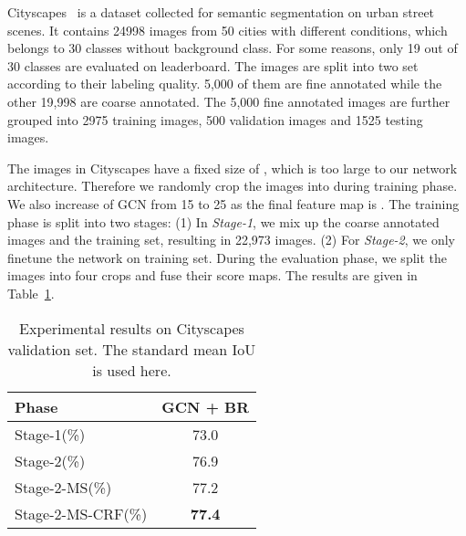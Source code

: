 \documentclass[10pt,twocolumn,letterpaper]{article}
\begin{document}
   Cityscapes~\cite{cordts2016cityscapes} is a dataset collected for semantic segmentation on urban street scenes. It contains 24998 images from 50 cities with different conditions, which belongs to 30 classes without background class. For some reasons, only 19 out of 30 classes are evaluated on leaderboard. The images are split into two set according to their labeling quality. 5,000 of them are fine annotated while the other 19,998 are coarse annotated. The 5,000 fine annotated images are further grouped into 2975 training images, 500 validation images and 1525 testing images. 
\par
   The images in Cityscapes have a fixed size of , which is too large to our network architecture. Therefore we randomly crop the images into  during training phase. We also increase  of GCN from 15 to 25 as the final feature map is . The training phase is split into two stages: (1) In \emph{Stage-1}, we mix up the coarse annotated images and the training set, resulting in 22,973 images. (2) For \emph{Stage-2}, we only finetune the network on training set. During the evaluation phase, we split the images into four  crops and fuse their score maps. The results are given in Table~\ref{table:cityscapes-train-val}. 
         \begin{table}[h]
      \begin{center}
\begin{tabular}{|l|c|}
            \hline
            Phase & GCN + BR\\
            \hline
            Stage-1(\%) & 73.0\\
            \hline
            Stage-2(\%) & 76.9\\
            \hline
            Stage-2-MS(\%) & 77.2\\
            \hline
            Stage-2-MS-CRF(\%) & \textbf{77.4}\\
            \hline
         \end{tabular}
      \end{center}
      \caption{Experimental results on Cityscapes validation set. The standard mean IoU is used here. }
      \label{table:cityscapes-train-val}
   \end{table}
\end{document}
